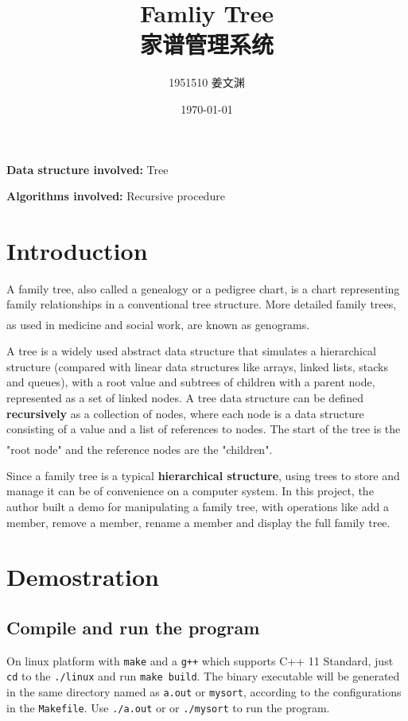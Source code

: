 \documentclass[cn,black,12pt,normal]{elegantnote}
\title{Famliy Tree\\家谱管理系统}
\author{1951510\; 姜文渊}
\institute{\small \url{https://github.com/jwyjohn/Jwy_DataStructureHomework}}
\date{\today}
\newcommand{\uct}[1]{\textsuperscript{\textsuperscript{\cite{#1}}}}
\begin{document}
\maketitle

\textbf{Data structure involved:} Tree

\textbf{Algorithms involved:} Recursive procedure

\tableofcontents

\newpage

\section{Introduction}
A family tree, also called a genealogy or a pedigree chart, is a chart representing family relationships in a conventional tree structure. More detailed family trees, as used in medicine and social work, are known as genograms.\uct{wiki:Family_tree}

A tree is a widely used abstract data structure that simulates a hierarchical structure (compared with linear data structures like arrays, linked lists, stacks and queues), with a root value and subtrees of children with a parent node, represented as a set of linked nodes. A tree data structure can be defined \textbf{recursively} as a collection of nodes, where each node is a data structure consisting of a value and a list of references to nodes. The start of the tree is the "root node" and the reference nodes are the "children".\uct{wiki:Tree_(data_structure)}

Since a family tree is a typical \textbf{hierarchical structure}, using trees to store and manage it can be of convenience on a computer system. In this project, the author built a demo for manipulating a family tree, with operations like add a member, remove a member, rename a member and display the full family tree.

\section{Demostration}

\subsection{Compile and run the program}

On linux platform with \lstinline{make} and a \lstinline{g++} which supports C++ 11 Standard, just \lstinline{cd} to the \lstinline{./linux} and run \lstinline{make build}. The binary executable will be generated in the same directory named as \lstinline{a.out} or \lstinline{mysort}, according to the configurations in the \lstinline{Makefile}. Use \lstinline{./a.out} or or \lstinline{./mysort} to run the program.
\end{document}
